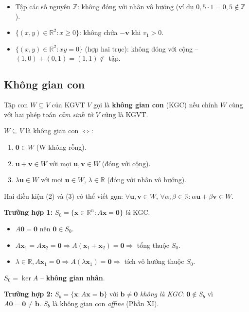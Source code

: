 \documentclass[12pt,a4paper]{article}
\begin{document}
\begin{phanvidu}[title={Những tập \emph{KHÔNG} là KGVT}]
\begin{itemize}
  \item Tập các số nguyên $\mathbb{Z}$: không đóng với nhân vô hướng (ví dụ $0{,}5 \cdot 1 = 0{,}5 \notin \mathbb{Z}$).
  \item $\{(x, y) \in \mathbb{R}^2 : x \ge 0\}$: không chứa $-\mathbf{v}$ khi $v_1 > 0$.
  \item $\{(x, y) \in \mathbb{R}^2 : xy = 0\}$ (hợp hai trục): không đóng với cộng -- $(1,0) + (0,1) = (1,1) \notin$ tập.
\end{itemize}
\end{phanvidu}

\subsection{Không gian con}

\begin{dinhnghia}
  Tập con $W \subseteq V$ của KGVT $V$ gọi là \textbf{không gian con} (KGC) nếu chính $W$ cùng với hai phép toán \emph{cảm sinh từ $V$} cũng là KGVT.
\end{dinhnghia}

\begin{dinhly}[title={Tiêu chuẩn KGC (3 điều kiện)}]
$W \subseteq V$ là không gian con $\Leftrightarrow$:
\begin{enumerate}
  \item $\mathbf{0} \in W$ (W không rỗng).
  \item $\mathbf{u} + \mathbf{v} \in W$ với mọi $\mathbf{u}, \mathbf{v} \in W$ (đóng với cộng).
  \item $\lambda \mathbf{u} \in W$ với mọi $\mathbf{u} \in W$, $\lambda \in \mathbb{R}$ (đóng với nhân vô hướng).
\end{enumerate}
Hai điều kiện (2) và (3) có thể viết gọn: $\forall \mathbf{u}, \mathbf{v} \in W,\, \forall \alpha, \beta \in \mathbb{R}: \alpha \mathbf{u} + \beta \mathbf{v} \in W$.
\end{dinhly}

\begin{vidu}[title={Tập nghiệm là KGC hay không?}]
\textbf{Trường hợp 1:} $S_0 = \{\mathbf{x} \in \mathbb{R}^n : A\mathbf{x} = \mathbf{0}\}$ \emph{là} KGC.
\begin{itemize}
  \item $A\mathbf{0} = \mathbf{0}$ nên $\mathbf{0} \in S_0$.
  \item $A\mathbf{x}_1 = A\mathbf{x}_2 = \mathbf{0} \Rightarrow A(\mathbf{x}_1 + \mathbf{x}_2) = \mathbf{0} \Rightarrow$ tổng thuộc $S_0$.
  \item $\lambda \in \mathbb{R}, A\mathbf{x}_1 = \mathbf{0} \Rightarrow A(\lambda \mathbf{x}_1) = \mathbf{0} \Rightarrow$ tích vô hướng thuộc $S_0$.
\end{itemize}
$S_0 = \ker A$ -- \textbf{không gian nhân}.

\textbf{Trường hợp 2:} $S_b = \{\mathbf{x} : A\mathbf{x} = \mathbf{b}\}$ với $\mathbf{b} \ne \mathbf{0}$ \emph{không là KGC}: $\mathbf{0} \notin S_b$ vì $A\mathbf{0} = \mathbf{0} \ne \mathbf{b}$. $S_b$ là không gian con \emph{affine} (Phần XI).
\end{vidu}
\end{document}
